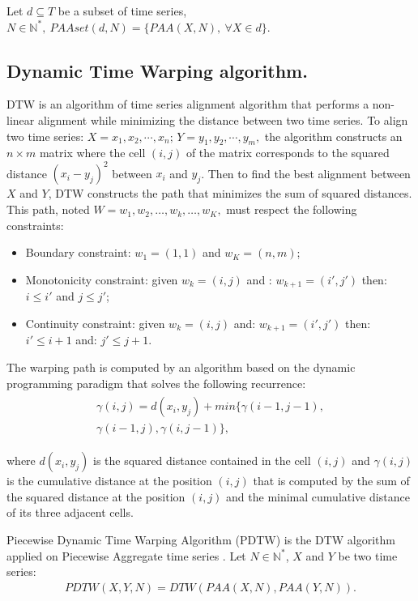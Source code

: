\begin{definition}
Let $d\subseteq T$ be a subset of time series,
$N\in\mathbb{N}^{*},\:PAAset(d,N)=\{PAA(X,N),\:\forall X\in d\}.$
\end{definition}

\subsection{Dynamic Time Warping algorithm.}
DTW \cite{sakoe1978dynamic} is an algorithm of time series alignment
algorithm that  performs a non-linear alignment while
minimizing the distance between two time series. To align two time series: 
$X=x_{1},x_{2},\cdots,x_{n};\,
Y=y_{1},y_{2},\cdots,y_{m},$ the algorithm constructs an  $n\times m$  matrix where the cell $(i,
j)$ of the matrix corresponds to the squared distance $(x_{i}-y_{j})^{2}$ between $x_{i}$
and $y_{j}$. Then to find the best alignment between $X$ and $Y$, DTW constructs the path that minimizes the sum of squared distances. This path, noted
$W = w_1, w_2, \ldots, w_k, \ldots, w_K,$ must respect the following constraints:
\begin{itemize}
  \item Boundary constraint: $w_1 = (1, 1)$ and  $w_K = (n, m)$;
  \item Monotonicity constraint: given $w_k = (i, j)$ and :  $w_{k + 1} =
  (i',j')$ then: $i \leq i'$ and $j \leq j'$;
 \item Continuity constraint: given $w_k = (i, j)$ and:   $w_{k + 1} = (i', j')$
 then: $i' \leq i + 1$ and: $j' \leq j + 1$.
\end{itemize}
The warping path is computed by  an algorithm based on the dynamic
programming paradigm that solves the following recurrence:
\begin{eqnarray}
\begin{array}{l}
\gamma(i,j)=d(x_{i},y_{j}) + min\{\gamma(i-1, j-1), \\
\gamma(i-1, j),\gamma(i, j-1)\},
\end{array}
\end{eqnarray}


where $d(x_{i},y_{j})$ is the squared distance contained in the cell $(i, j)$ and $\gamma(i, j)$ is the cumulative distance at the position $(i, j)$ that is computed by the sum of the squared distance at the position $(i, j)$ and the minimal cumulative distance of its three adjacent cells.


Piecewise Dynamic Time Warping Algorithm (PDTW) \cite{keogh2000scaling} is the DTW algorithm applied on Piecewise Aggregate time series \cite{keogh2001dimensionality}. Let $N\in\mathbb{N^{*}}$, $X$ and $Y$ be two time series:
\begin{eqnarray}
PDTW(X, Y, N) = DTW(PAA(X, N), PAA(Y, N)).
\end{eqnarray}

